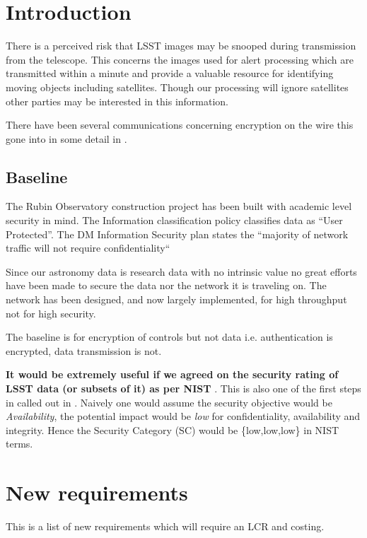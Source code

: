 \section{Introduction} \label{sec:intro}

There is a perceived  risk that LSST  images may be snooped during transmission from the telescope. This concerns the images used for alert processing which are transmitted within a minute and provide a valuable resource for identifying moving objects including satellites. Though our processing will ignore satellites other parties may be interested in this information.

There have been several communications concerning encryption on the wire this gone into in some detail in .


\subsection{Baseline }
The Rubin Observatory construction project has been built with academic level security in mind.
The
 Information classification policy  classifies data as  “User Protected”.
The DM Information Security plan  states the “majority of network traffic will not require confidentiality“

Since our astronomy data is research data with no intrinsic value no great efforts have been made to secure the
data nor the network it is traveling on.
The network has been designed, and now largely implemented, for high throughput not for high security.

The baseline is for encryption of controls but not data i.e. authentication is encrypted, data transmission is not.

{\bf It would be extremely useful if we agreed on the security rating of LSST data (or subsets of it)  as per NIST  }. This is also one of the first steps in  called out in .
Naively one would assume the security objective would be \emph{Availability}, the potential impact would be \emph{low} for confidentiality, availability and integrity. Hence  the Security Category (SC) would be \{low,low,low\} in NIST terms.

\section{New requirements}
This is a list of new requirements which will require an LCR and costing.

